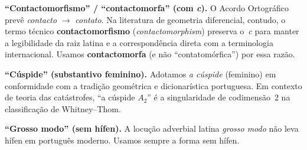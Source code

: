 \documentclass[12pt,a4paper,twoside]{book}
\theoremstyle{plain}
\theoremstyle{definition}
\theoremstyle{definition}
\begin{document}
\medskip
\textbf{``Contactomorfismo'' / ``contactomorfa'' (com \textit{c}).}
O Acordo Ortográfico prevê \emph{contacto} $\to$ \emph{contato}.
Na literatura de geometria diferencial, contudo, o termo técnico
\textbf{contactomorfismo} (\emph{contactomorphism}) preserva
o~\textit{c} para manter a legibilidade da raiz latina e a
correspondência direta com a terminologia internacional.
Usamos \textbf{contactomorfa} (e não ``contatomórfica'') por essa razão.

\medskip
\textbf{``Cúspide'' (substantivo feminino).}
Adotamos \emph{a cúspide} (feminino) em conformidade com a tradição
geométrica e dicionarística portuguesa. Em contexto de teoria das
catástrofes, ``a cúspide $A_2$'' é a singularidade de codimensão~2
na classificação de Whitney--Thom.

\medskip
\textbf{``Grosso modo'' (sem hífen).}
A locução adverbial latina \emph{grosso modo} não leva hífen em
português moderno. Usamos sempre a forma sem hífen.
\end{document}

